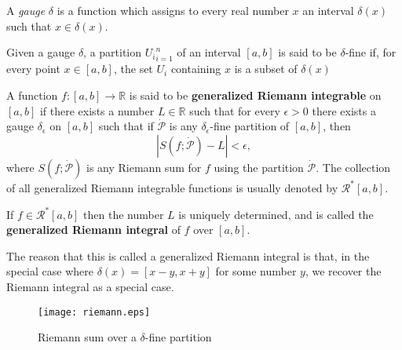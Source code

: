 \documentclass[12pt]{article}
\begin{document}
A \emph{gauge} $\delta$ is a function which assigns to every real number $x$ an interval $\delta (x)$ such that $x \in \delta (x)$.

Given a gauge $\delta$, a partition ${U_i}_{i=1}^n$ of an interval $[a,b]$ is said to be $\delta$-fine if, for every point $x \in [a,b]$, the set $U_i$ containing $x$ is a subset of $\delta (x)$

A function $f : [a, b] \rightarrow \mathbb{R}$ is said to be \textbf{generalized Riemann integrable} on $[a,b]$ if there exists a number $L \in \mathbb{R}$ such that for every $\epsilon > 0$ there exists a gauge $\delta_{\epsilon}$ on $[a,b]$ such that if $\dot{\mathcal{P}}$ is any $\delta_{\epsilon}$-fine partition of $[a,b]$, then
\[| S(f ; \dot{\mathcal{P}}) - L | < \epsilon,\]
where $S(f ; \dot{\mathcal{P}})$ is any Riemann sum for $f$ using the partition $\dot{\mathcal{P}}$. The collection of all generalized Riemann integrable functions is usually denoted by $\mathcal{R}^{*}[a,b]$.

If $f \in \mathcal{R}^{*}[a,b]$ then the number $L$ is uniquely determined, and is called the \textbf{generalized Riemann integral} of $f$ over $[a,b]$.

The reason that this is called a generalized Riemann integral is that, in the special case where $\delta (x) = [x - y, x + y]$ for some number $y$, we recover the Riemann integral as a special case.

\begin{figure}[!htb]
\begin{center}
\texttt{[image: riemann.eps]}
\caption{Riemann sum over a $\delta$-fine partition}
\end{center}
\end{figure}


\end{document}
